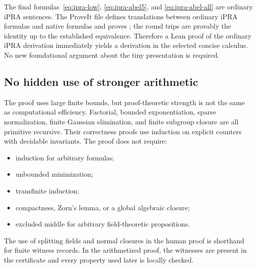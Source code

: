The final formulas~\eqref{eq:ipra-low}, \eqref{eq:ipra-abel5}, and
\eqref{eq:ipra-abel-all} are ordinary iPRA sentences.  The ProveIt file
defines translations between ordinary iPRA formulas and native formulas and
proves ; the round trips
are provably the identity up to the established equivalence.  Therefore a
Lean proof of the ordinary iPRA derivation immediately yields a derivation in
the selected concise calculus.  No new foundational argument about the tiny
presentation is required.

\subsection{No hidden use of stronger arithmetic}

The proof uses large finite bounds, but proof-theoretic strength is not the
same as computational efficiency.  Factorial, bounded exponentiation, sparse
normalization, finite Gaussian elimination, and finite subgroup closure are
all primitive recursive.  Their correctness proofs use induction on explicit
counters with decidable invariants.  The proof does not require:

\begin{itemize}
\item induction for arbitrary formulas;
\item unbounded minimization;
\item transfinite induction;
\item compactness, Zorn's lemma, or a global algebraic closure;
\item excluded middle for arbitrary field-theoretic propositions.
\end{itemize}

The use of splitting fields and normal closures in the human proof is shorthand
for finite witness records.  In the arithmetized proof, the witnesses are
present in the certificate and every property used later is locally checked.
